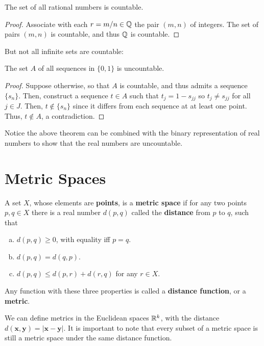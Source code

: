 \begin{corollary}
The set of all rational numbers is countable.

\begin{proof}
Associate with each $r = m/n \in \mathbb{Q}$ the pair $(m, n)$ of integers. The set of pairs $(m, n)$ is countable, and thus $\mathbb{Q}$ is countable.
\end{proof}
\end{corollary}

But not all infinite sets are countable:

\begin{theorem}
The set $A$ of all sequences in $\{0, 1\}$ is uncountable.

\begin{proof}
Suppose otherwise, so that $A$ is countable, and thus admits a sequence $\{s_n\}$. Then, construct a sequence $t \in A$ such that $t_j = 1 - s_{jj}$ so $t_j \ne s_{jj}$ for all $j \in J$. Then, $t \not\in \{s_n\}$ since it differs from each sequence at at least one point. Thus, $t \not\in A$, a contradiction.
\end{proof}
\end{theorem}

Notice the above theorem can be combined with the binary representation of real numbers to show that the real numbers are uncountable.

\section{Metric Spaces}

\begin{definition}
A set $X$, whose elements are \textbf{points}, is a \textbf{metric space} if for any two points $p, q \in X$ there is a real number $d(p, q)$ called the \textbf{distance} from $p$ to $q$, such that
\begin{enumerate}[(a)]
\item $d(p, q) \ge 0$, with equality iff $p = q$.
\item $d(p, q) = d(q, p)$.
\item $d(p, q) \le d(p, r) + d(r, q)$ for any $r \in X$.
\end{enumerate}
Any function with these three properties is called a \textbf{distance function}, or a \textbf{metric}.
\end{definition}

We can define metrics in the Euclidean spaces $\mathbb{R}^k$, with the distance $d(\textbf{x}, \textbf{y}) = |\textbf{x} - \textbf{y}|$. It is important to note that every subset of a metric space is still a metric space under the same distance function.

